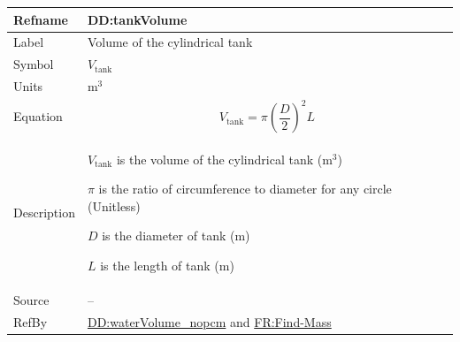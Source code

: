 \documentclass[12pt]{article}
\begin{document}
\vspace{\baselineskip}
\noindent
\begin{minipage}{\textwidth}
\begin{tabular}{>{\raggedright}p{}>{\raggedright\arraybackslash}p{}}
\toprule \textbf{Refname} & \textbf{DD:tankVolume}
\label{DD:tankVolume}
\\ \midrule
Label & Volume of the cylindrical tank
        
\\ \midrule
Symbol & ${V_{\text{tank}}}$
         
\\ \midrule
Units & ${\text{m}^{3}}$
        
\\ \midrule
Equation & \begin{displaymath}
           {V_{\text{tank}}}=π \left(\frac{D}{2}\right)^{2} L
           \end{displaymath}
\\ \midrule
Description & \begin{symbDescription}
              \item{${V_{\text{tank}}}$ is the volume of the cylindrical tank (${\text{m}^{3}}$)}
              \item{$π$ is the ratio of circumference to diameter for any circle (Unitless)}
              \item{$D$ is the diameter of tank (${\text{m}}$)}
              \item{$L$ is the length of tank (${\text{m}}$)}
              \end{symbDescription}
\\ \midrule
Source & --
         
\\ \midrule
RefBy & \hyperref[DD:waterVolume.nopcm]{DD:waterVolume\_nopcm} and \hyperref[findMass]{FR:Find-Mass}
        
\\ \bottomrule
\end{tabular}
\end{minipage}
\end{document}
